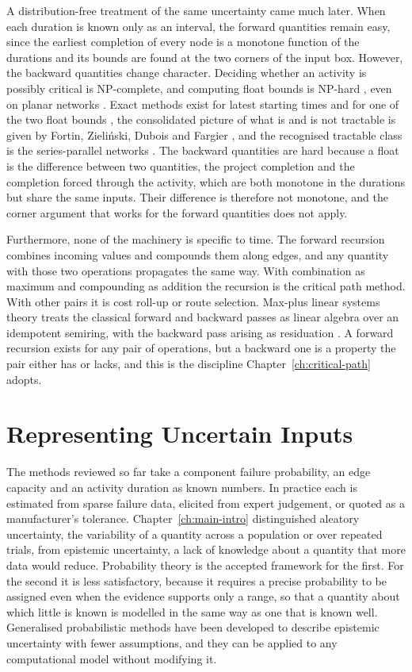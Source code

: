 \documentclass[12pt]{report}
\begin{document}
A distribution-free treatment of the same uncertainty came much later. When each duration is
known only as an interval, the forward quantities remain easy, since the earliest completion of
every node is a monotone function of the durations and its bounds are found at the two corners
of the input box. However, the backward quantities change character. Deciding whether an activity is
possibly critical is NP-complete, and computing float bounds is NP-hard
\cite{chanas2002complexity}, even on planar networks \cite{chanas2003planar}. Exact methods
exist for latest starting times and for one of the two float bounds \cite{dubois2005floats},
the consolidated picture of what is and is not tractable is given by Fortin, Zieli\'{n}ski,
Dubois and Fargier \cite{fortin2010criticality}, and the recognised tractable class is the
series-parallel networks \cite{valdes1982seriesparallel}. The backward quantities are hard
because a float is the difference between two quantities, the project completion and the
completion forced through the activity, which are both monotone in the durations but share the
same inputs. Their difference is therefore not monotone, and the corner argument that works for
the forward quantities does not apply.

Furthermore, none of the machinery is specific to time. The forward recursion combines
incoming values and compounds them along edges, and any quantity with those two operations
propagates the same way. With combination as maximum and compounding as addition the recursion
is the critical path method. With other pairs it is cost roll-up or route selection.
Max-plus linear
systems theory treats the classical forward and
backward passes as linear algebra over an idempotent semiring, with the backward pass arising
as residuation \cite{baccelli1992sync}. A forward recursion exists for any pair of operations,
but a backward one is a property the pair either has or lacks, and this is the discipline
Chapter~\ref{ch:critical-path} adopts.

\section{Representing Uncertain Inputs}
\label{sec:bg-uncertainty}

The methods reviewed so far take a component failure probability, an edge capacity and an
activity duration as known numbers. In practice each is estimated from sparse failure data,
elicited from expert judgement, or quoted as a manufacturer's tolerance. Chapter~\ref{ch:main-intro}
distinguished aleatory uncertainty, the variability of a quantity across a population or over
repeated trials, from epistemic uncertainty, a lack of knowledge about a quantity that more
data would reduce. Probability theory is the accepted framework for the first. For the second
it is less satisfactory, because it requires a precise probability to be assigned even when the
evidence supports only a range, so that a quantity about which little is known is modelled in
the same way as one that is known well. Generalised probabilistic methods have been developed
to describe epistemic uncertainty with fewer assumptions, and they can be applied to any
computational model without modifying it.
\end{document}
